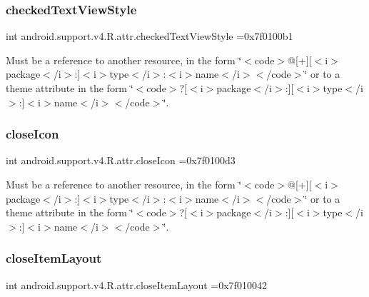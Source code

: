 \subsubsection{\texorpdfstring{checked\+Text\+View\+Style}{checkedTextViewStyle}}
{\footnotesize\ttfamily int android.\+support.\+v4.\+R.\+attr.\+checked\+Text\+View\+Style =0x7f0100b1\hspace{0.3cm}{\ttfamily [static]}}

Must be a reference to another resource, in the form \char`\"{}$<$code$>$@\mbox{[}+\mbox{]}\mbox{[}$<$i$>$package$<$/i$>$\+:\mbox{]}$<$i$>$type$<$/i$>$\+:$<$i$>$name$<$/i$>$$<$/code$>$\char`\"{} or to a theme attribute in the form \char`\"{}$<$code$>$?\mbox{[}$<$i$>$package$<$/i$>$\+:\mbox{]}\mbox{[}$<$i$>$type$<$/i$>$\+:\mbox{]}$<$i$>$name$<$/i$>$$<$/code$>$\char`\"{}. \mbox{\label{classandroid_1_1support_1_1v4_1_1R_1_1attr_af7159ba49dfc915e970744102e5910fe}} 
\subsubsection{\texorpdfstring{close\+Icon}{closeIcon}}
{\footnotesize\ttfamily int android.\+support.\+v4.\+R.\+attr.\+close\+Icon =0x7f0100d3\hspace{0.3cm}{\ttfamily [static]}}

Must be a reference to another resource, in the form \char`\"{}$<$code$>$@\mbox{[}+\mbox{]}\mbox{[}$<$i$>$package$<$/i$>$\+:\mbox{]}$<$i$>$type$<$/i$>$\+:$<$i$>$name$<$/i$>$$<$/code$>$\char`\"{} or to a theme attribute in the form \char`\"{}$<$code$>$?\mbox{[}$<$i$>$package$<$/i$>$\+:\mbox{]}\mbox{[}$<$i$>$type$<$/i$>$\+:\mbox{]}$<$i$>$name$<$/i$>$$<$/code$>$\char`\"{}. \mbox{\label{classandroid_1_1support_1_1v4_1_1R_1_1attr_aceba222aab6eef55aba6d3ec6be64f78}} 
\subsubsection{\texorpdfstring{close\+Item\+Layout}{closeItemLayout}}
{\footnotesize\ttfamily int android.\+support.\+v4.\+R.\+attr.\+close\+Item\+Layout =0x7f010042\hspace{0.3cm}{\ttfamily [static]}}

